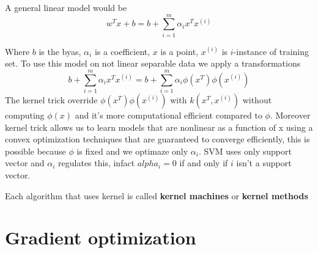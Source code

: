 A general linear model would be
$$w^T x + b = b+ \sum_{i=1}^m \alpha_ix^Tx^{(i)}$$

Where $b$ is the byas, $\alpha_i$ is a coefficient, $x$ is a point, $x^(i)$ is 
$i$-instance of training set.
To use this model on not linear separable data we apply a transformations 
$$ b+ \sum_{i=1}^m \alpha_ix^Tx^{(i)} = b+ \sum_{i=1}^m \alpha_i\phi (x^T)\phi(x^{(i)}) $$
The kernel trick override $\phi (x^T)\phi(x^{(i)})$ with $k(x^T, x^(i))$ without 
computing $\phi(x)$ and it's more computational efficient compared to $\phi$. Moreover
kernel trick allows us to learn models that are nonlinear as a function of x using 
a convex optimization techniques that are guaranteed to converge efficiently, this is 
possible because $\phi $ is fixed and we optimaze only $\alpha_i$.
SVM uses only support vector and $\alpha_i$ regulates this, infact $alpha_i= 0$
if and only if $i$ isn't a support vector.

Each algorithm that uses kernel is called \textbf{kernel machines} or \textbf{kernel 
methods}

\section{Gradient optimization}